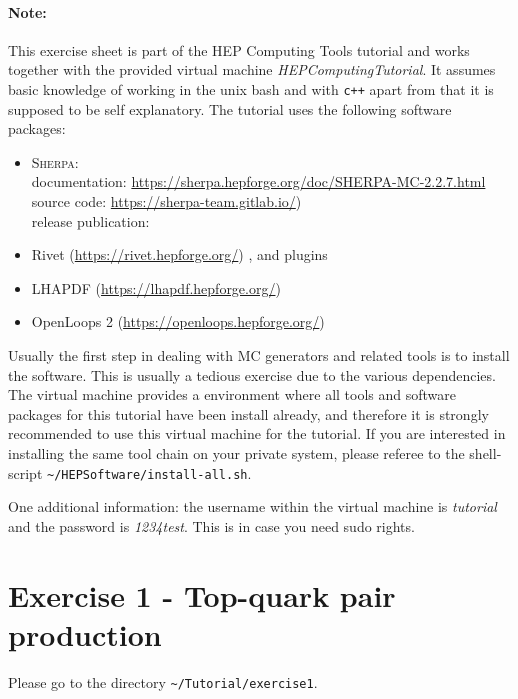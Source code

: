\documentclass[a4paper,DIV12,fleqn]{scrartcl}
\begin{document}
\paragraph{Note:} This exercise sheet is part of the HEP Computing Tools
tutorial and works together with the provided virtual machine
\emph{HEPComputingTutorial}. It assumes basic knowledge of working in the
unix bash and with \verb|c++| apart from that it is supposed to be
self explanatory. The tutorial uses the following software packages:
\begin{itemize}
  \item \textsc{Sherpa}:\\
        documentation:
          \url{https://sherpa.hepforge.org/doc/SHERPA-MC-2.2.7.html}\\
        source code: \url{https://sherpa-team.gitlab.io/})\\
        release publication: \cite{Gleisberg:2008ta}
  \item Rivet (\url{https://rivet.hepforge.org/}) \cite{Bierlich:2019rhm},
        and plugins
  \item LHAPDF (\url{https://lhapdf.hepforge.org/}) \cite{Buckley:2014ana}
  \item OpenLoops 2 (\url{https://openloops.hepforge.org/})
        \cite{Buccioni:2019sur}
\end{itemize}
Usually the first step in dealing with MC generators and related tools
is to install the software. This is usually a tedious exercise due to
the various dependencies.
The virtual machine provides a environment where all tools and software
packages for this tutorial have been install already, and therefore
it is strongly
recommended to use this virtual machine for the tutorial. If you are
interested in installing the same tool chain on your private system, please
referee to the shell-script \verb|~/HEPSoftware/install-all.sh|.


One additional information: the username within the virtual machine
is \emph{tutorial} and the password is \emph{1234test}. This is in case
you need sudo rights.

\section{Exercise 1 - Top-quark pair production}
\label{sec:task1}

Please go to the directory \verb|~/Tutorial/exercise1|.
\end{document}
